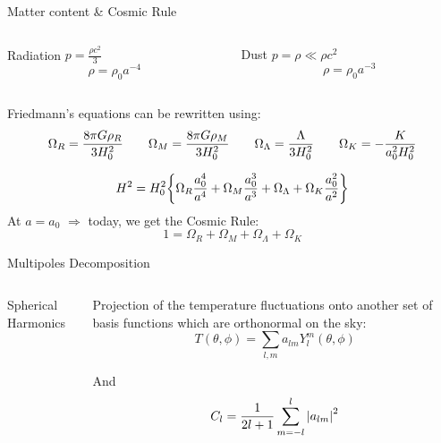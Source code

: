 \documentclass{beamer}
\begin{document}
\begin{frame}{Matter content & Cosmic Rule}

    	\begin{columns}
        	\begin{column}{0.5\textwidth}
        	    	\begin{center}
        	    	Radiation $p = \frac{\rho c^2}{3}$
        	    	$$\rho = \rho_0 a^{-4}$$
              	\end{center}

        	\end{column}
            \begin{column}{0.5\textwidth}
             \begin{center}
              Dust $p=\rho \ll \rho c^2$
              $$\rho = \rho_0 a^{-3}$$
             \end{center}
        	\end{column}
    	\end{columns}
    	\vspace{0.5cm}
    	Friedmann's equations can be rewritten using:
    	\begin{eqnarray}
    	     \Omega_R = \frac{8 \pi G \rho_R}{3 H_0 ^2} \qquad
    	     \Omega_M =  \frac{8 \pi G \rho_M}{3 H_0 ^2} \qquad
    	     \Omega_\Lambda =  \frac{\Lambda}{3 H_0 ^2} \qquad
    	     \Omega_K = -\frac{K}{a_0 ^2 H_0 ^2} \notag
    	\end{eqnarray}
    	    	
    	$$
    	H^2 = H_0 ^2 \qty{\Omega_R \frac{a_0 ^4}{a^4} + \Omega_M \frac{a_0 ^3}{a^3} + \Omega_\Lambda + \Omega_K \frac{a_0 ^2}{a^2}} 
    	$$
    	At $a =a_0$ $\Rightarrow$ today, we get the Cosmic Rule: 
    	$$
    	1 = \Omega_R +  \Omega_M + \Omega_\Lambda + \Omega_K
    	$$
\end{frame}

\begin{frame}{Multipoles Decomposition}
    	\begin{columns}
		\begin{column}{4cm}
			 \animategraphics[loop,controls,width=\textwidth]{4}{multipole-}{0}{34}
			\begin{center}
				\tiny
				Spherical Harmonics
			\end{center}
		\end{column}
		\begin{column}{6cm}
			Projection of the temperature fluctuations onto another set of basis functions which are orthonormal on the sky:
			$$
			 T(\theta,\phi) = \sum_{l,m} a_{lm} Y^m _l (\theta,\phi)
			$$
			
			And $$C_l = \frac{1}{2l +1} \sum _{m=-l} ^l \abs{a_{lm}} ^2$$
		\end{column}
	\end{columns}
    
\end{frame}
\end{document}
